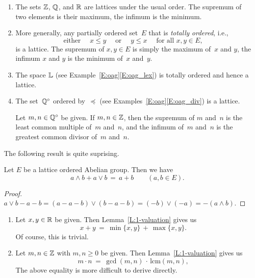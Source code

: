 \documentclass[main.tex]{subfiles}
\begin{document}
\begin{exs}
\label{E:loag}
\begin{enumerate}
\item
The sets
$\mathbb{Z}$, $\mathbb{Q}$, and $\mathbb{R}$ are lattices
under the usual order.
The supremum of two elements is their maximum,
the infimum is the minimum.

\item
More generally,
any partially ordered set~$E$
that is \emph{totally ordered},
i.e.,
\begin{equation*}
\text{either } \quad x\leq y\quad\text{ or } 
\quad y\leq x\quad \text{ for all }x,y\in E,
\end{equation*}
is a lattice.
The supremum of $x,y\in E$ is simply the maximum of~$x$ and $y$,
the infimum $x$ and $y$ is the minimum of~$x$ and~$y$.

\item
The space $\mathbb{L}$
(see Example~\ref{E:oag}\ref{E:oag_lex})
is totally ordered and hence a lattice.

\item
\label{E:loag_div}
The set~$\mathbb{Q}^\circ$ ordered by~$\preccurlyeq$
(see Examples~\ref{E:oag}\ref{E:oag_div})
is a lattice.

Let $m,n\in \mathbb{Q}^\circ$ be given.
If $m,n\in \mathbb{Z}$, then the supremum of $m$ and~$n$
is the least common multiple of~$m$ and~$n$,
and the infimum of~$m$ and~$n$ is the greatest common divisor
of~$m$ and~$n$.

\end{enumerate}
\end{exs}

The following result is quite suprising.
%
%
\begin{lem}
\label{L:1-valuation}
Let $E$ be a lattice ordered Abelian group.
Then we have 
\begin{equation*}
a\wedge b  + a\vee b \,=\, a+b \qquad(a,b\in E).
\end{equation*}
\end{lem}
\begin{proof}
$a\vee b - a - b
= (a - a - b) \vee (b - a - b)
= (-b)\vee(-a) = -(a\wedge b)$.
\end{proof}
\begin{exs}
\begin{enumerate}
\item
Let $x,y\in \mathbb{R}$ be given.
Then Lemma~\ref{L:1-valuation}
gives us
\begin{equation*}
x+y\ =\ \min\{x,y\} \,+\, \max\{x,y\}.
\end{equation*}
Of course, this is trivial.

\item
Let $m,n\in \mathbb{Z}$ with $m,n\geq 0$ be given.
Then Lemma~\ref{L:1-valuation}
gives us
\begin{equation*}
m\cdot n \ =\ \gcd(m,n) \,\cdot\,\mathrm{lcm}(m,n),
\end{equation*}
The above equality is more difficult to derive directly.
\end{enumerate}
\end{exs}
\end{document}
